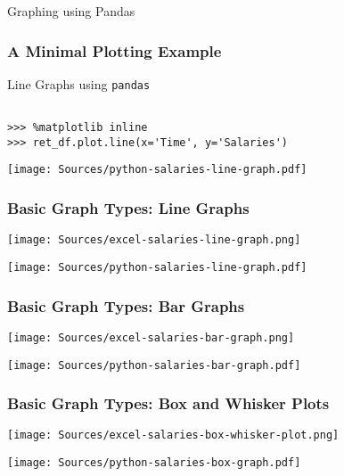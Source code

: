\documentclass[handout, 11pt]{beamer}
\begin{document}
\begin{section}[Graphs]{Graphing using Pandas}
\begin{frame}[fragile]
\frametitle{A Minimal Plotting Example}
\begin{block}{Line Graphs using \texttt{pandas}}
\begin{verbatim}

>>> %matplotlib inline
>>> ret_df.plot.line(x='Time', y='Salaries')

\end{verbatim}
\texttt{[image: Sources/python-salaries-line-graph.pdf]}
\end{block}
\end{frame}
\begin{frame}
\frametitle{Basic Graph Types: Line Graphs}
\begin{adjustbox}{width=0.425\textwidth, height=0.8\textheight, keepaspectratio}
\texttt{[image: Sources/excel-salaries-line-graph.png]}
\end{adjustbox}
\hfill
\begin{adjustbox}{width=0.425\textwidth, height=0.8\textheight, keepaspectratio}
\texttt{[image: Sources/python-salaries-line-graph.pdf]}
\end{adjustbox}
\end{frame}
\begin{frame}
\frametitle{Basic Graph Types: Bar Graphs}
\begin{adjustbox}{width=0.425\textwidth, height=0.8\textheight, keepaspectratio}
\texttt{[image: Sources/excel-salaries-bar-graph.png]}
\end{adjustbox}
\hfill
\begin{adjustbox}{width=0.425\textwidth, height=0.8\textheight, keepaspectratio}
\texttt{[image: Sources/python-salaries-bar-graph.pdf]}
\end{adjustbox}
\end{frame}
\begin{frame}
\frametitle{Basic Graph Types: Box and Whisker Plots}
\begin{adjustbox}{width=0.425\textwidth, height=0.8\textheight, keepaspectratio}
\texttt{[image: Sources/excel-salaries-box-whisker-plot.png]}
\end{adjustbox}
\hfill
\begin{adjustbox}{width=0.425\textwidth, height=0.8\textheight, keepaspectratio}
\texttt{[image: Sources/python-salaries-box-graph.pdf]}

\end{adjustbox}
\end{frame}
\end{section}
\end{document}
